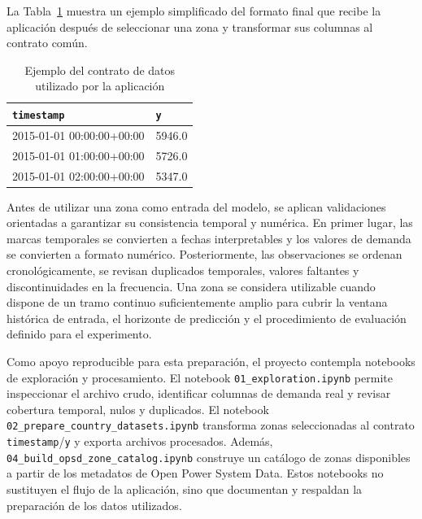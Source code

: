 La Tabla~\ref{tab:contrato-datos} muestra un ejemplo simplificado del formato final que recibe la aplicación después de seleccionar una zona y transformar sus columnas al contrato común.

\begin{table}[htbp]
    \centering
    \caption{Ejemplo del contrato de datos utilizado por la aplicación}
    \label{tab:contrato-datos}
    \begin{tabular}{ll}
        \toprule
        \texttt{timestamp}        & \texttt{y} \\
        \midrule
        2015-01-01 00:00:00+00:00 & 5946.0     \\
        2015-01-01 01:00:00+00:00 & 5726.0     \\
        2015-01-01 02:00:00+00:00 & 5347.0     \\
        \bottomrule
    \end{tabular}
\end{table}

Antes de utilizar una zona como entrada del modelo, se aplican validaciones orientadas a garantizar su consistencia temporal y numérica. En primer lugar, las marcas temporales se convierten a fechas interpretables y los valores de demanda se convierten a formato numérico. Posteriormente, las observaciones se ordenan cronológicamente, se revisan duplicados temporales, valores faltantes y discontinuidades en la frecuencia. Una zona se considera utilizable cuando dispone de un tramo continuo suficientemente amplio para cubrir la ventana histórica de entrada, el horizonte de predicción y el procedimiento de evaluación definido para el experimento.

Como apoyo reproducible para esta preparación, el proyecto contempla notebooks de exploración y procesamiento. El notebook \texttt{01\_exploration.ipynb} permite inspeccionar el archivo crudo, identificar columnas de demanda real y revisar cobertura temporal, nulos y duplicados. El notebook \texttt{02\_prepare\_country\_datasets.ipynb} transforma zonas seleccionadas al contrato \texttt{timestamp}/\texttt{y} y exporta archivos procesados. Además, \texttt{04\_build\_opsd\_zone\_catalog.ipynb} construye un catálogo de zonas disponibles a partir de los metadatos de Open Power System Data. Estos notebooks no sustituyen el flujo de la aplicación, sino que documentan y respaldan la preparación de los datos utilizados.


